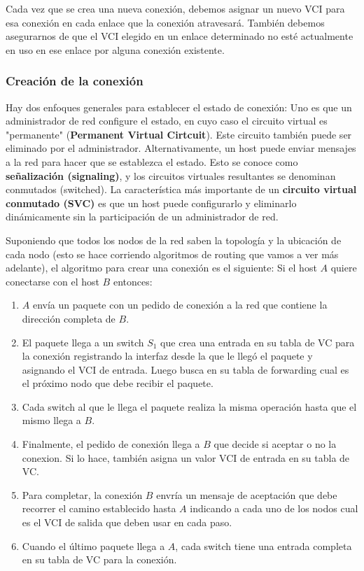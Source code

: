  Cada vez que se crea una nueva conexión, debemos asignar un nuevo VCI para esa conexión en cada enlace que la conexión atravesará. También debemos asegurarnos de que el VCI elegido en un enlace determinado no esté actualmente en uso en ese enlace por alguna conexión existente.

\subsubsection{Creación de la conexión}
 Hay dos enfoques generales para establecer el estado de conexión: Uno es que un administrador de red configure el estado, en cuyo caso el circuito virtual es "permanente" (\textbf{Permanent Virtual Cirtcuit}). Este circuito también puede ser eliminado por el administrador. Alternativamente, un host puede enviar mensajes a la red para hacer que se establezca el estado. Esto se conoce como \textbf{señalización (signaling)}, y los circuitos virtuales resultantes se denominan conmutados (switched). La característica más importante de un \textbf{circuito virtual conmutado (SVC)} es que un host puede configurarlo y eliminarlo dinámicamente sin la participación de un administrador de red.

 Suponiendo que todos los nodos de la red saben la topología y la ubicación de cada nodo (esto se hace corriendo algoritmos de routing que vamos a ver más adelante), el algoritmo para crear una conexión es el siguiente: Si el host \(A\) quiere conectarse con el host \(B\) entonces:

 \begin{enumerate}
  \item \(A\) envía un paquete con un pedido de conexión a la red que contiene la dirección completa de \(B\).
  \item El paquete llega a un switch \(S_1\) que crea una entrada en su tabla de VC para la conexión registrando la interfaz desde la que le llegó el paquete y asignando el VCI de entrada. Luego busca en su tabla de forwarding cual es el próximo nodo que debe recibir el paquete.
  \item Cada switch al que le llega el paquete realiza la misma operación hasta que el mismo llega a \(B\).
  \item Finalmente, el pedido de conexión llega a \(B\) que decide si aceptar o no la conexion. Si lo hace, también asigna un valor VCI de entrada en su tabla de VC.
  \item Para completar, la conexión \(B\) envría un mensaje de aceptación que debe recorrer el camino establecido hasta \(A\) indicando a cada uno de los nodos cual es el VCI de salida que deben usar en cada paso.
  \item Cuando el último paquete llega a \(A\), cada switch tiene una entrada completa en su tabla de VC para la conexión.
  \end{enumerate}

